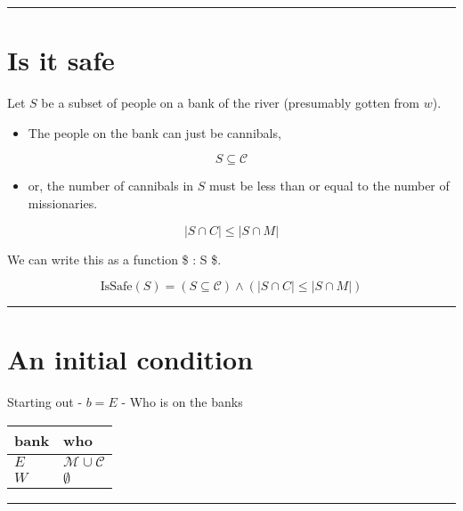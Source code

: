 \documentclass{article}
\begin{document}
\begin{center}\rule{0.5\linewidth}{0.5pt}\end{center}

\section{Is it safe}\label{is-it-safe}

Let \(S\) be a subset of people on a bank of the river (presumably
gotten from \(w\)).

\begin{itemize}

\item
  The people on the bank can just be cannibals,
\end{itemize}

\[S \subseteq \mathcal{C}\]

\begin{itemize}

\item
  or, the number of cannibals in \(S\) must be less than or equal to the
  number of missionaries.
\end{itemize}

\[|S \cap C| \leq |S \cap M|\]

We can write this as a function \$  : S
\rightarrow {}\$.

\[\text{IsSafe}(S) = \left( S \subseteq \mathcal{C} \right) \wedge ( |S \cap C| \leq |S \cap M| )\]

\begin{center}\rule{0.5\linewidth}{0.5pt}\end{center}

\section{An initial condition}\label{an-initial-condition}

Starting out - \(b = E\) - Who is on the banks

\begin{longtable}[]{@{}ll@{}}
\toprule\noalign{}
bank & who \\
\midrule\noalign{}
\endhead
\bottomrule\noalign{}
\endlastfoot
\(E\) & \(\mathcal{M} \cup \mathcal{C}\) \\
\(W\) & \(\emptyset\) \\
\end{longtable}

\begin{center}\rule{0.5\linewidth}{0.5pt}\end{center}
\end{document}
